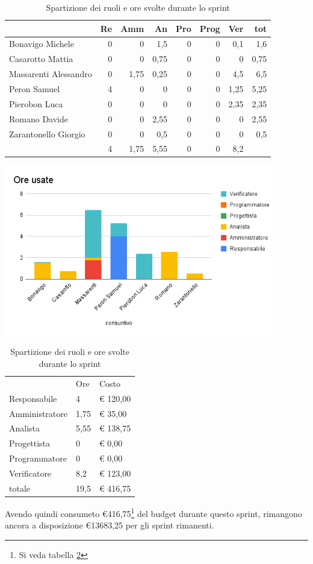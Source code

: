 \begin{table}[h]
    \begin{tabularx}{\linewidth}{X|rrrrrrr}
    \rowcolor{gray!30}& Re & Amm & An & Pro & Prog & Ver & tot \\
    \hline
    Bonavigo Michele      & 0 & 0    & 1,5  & 0 & 0 & 0,1  & 1,6 \\
    \rowcolor{gray!10}Casarotto Mattia      & 0 & 0    & 0,75 & 0 & 0 & 0    & 0,75\\
    Massarenti Alessandro & 0 & 1,75 & 0,25 & 0 & 0 & 4,5  & 6,5 \\
    \rowcolor{gray!10}Peron Samuel          & 4 & 0    & 0    & 0 & 0 & 1,25 & 5,25\\
    Pierobon Luca         & 0 & 0    & 0    & 0 & 0 & 2,35 & 2,35\\
    \rowcolor{gray!10}Romano Davide         & 0 & 0    & 2,55 & 0 & 0 & 0    & 2,55\\
    Zarantonello Giorgio  & 0 & 0    & 0,5  & 0 & 0 & 0    & 0,5 \\
    \hline
                          & 4 & 1,75 & 5,55 & 0 & 0 & 8,2  & 
    \end{tabularx}
    \caption{\label{ruoli-persone}Spartizione dei ruoli e ore svolte durante lo sprint}
\end{table}

\begin{center}
\includegraphics[width=12cm]{img/ore-usate.png}
\end{center}

\begin{table}[h]
    \begin{tabularx}{\linewidth}{X|l|l}
    \rowcolor{gray!30}& Ore & Costo \\
    
    Responsabile & 4 & € 120,00 \\
    \rowcolor{gray!10}Amministratore & 1,75 & € 35,00 \\
    Analista & 5,55 & € 138,75 \\
    \rowcolor{gray!10}Progettista & 0 & € 0,00 \\
    Programmatore & 0 & € 0,00 \\
    \rowcolor{gray!10}Verificatore & 8,2 &€ 123,00 \\
    totale & 19,5 & € 416,75 \\
    \end{tabularx}
    \caption{\label{costi-ruolo}Spartizione dei ruoli e ore svolte durante lo sprint}
\end{table}


Avendo quindi consumeto €416,75\footnote{Si veda tabella \ref{costi-ruolo}} del budget durante questo sprint, rimangono ancora a disposizione €13683,25 per gli sprint rimanenti.
